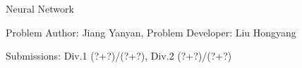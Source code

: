 \begin{Solution}{Neural Network}

\begin{frame}{\ProblemName}

\small Problem Author: Jiang Yanyan, Problem Developer: Liu Hongyang \par \vspace{0.3cm}

\small Submissions: Div.1 (?+?)/(?+?), Div.2 (?+?)/(?+?)  \par \vspace{0.5cm}


\end{frame}

\end{Solution}
